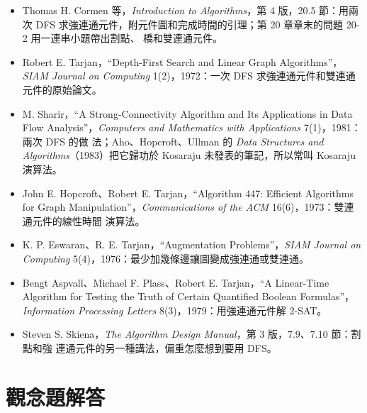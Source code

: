 \begin{itemize}
\item Thomas H. Cormen 等，\textit{Introduction to Algorithms}，第 4 版，20.5 節：用兩次
DFS 求強連通元件，附元件圖和完成時間的引理；第 20 章章末的問題 20-2 用一連串小題帶出割點、
橋和雙連通元件。
\item Robert E. Tarjan，``Depth-First Search and Linear Graph Algorithms''，\textit{SIAM
Journal on Computing} 1(2)，1972：一次 DFS 求強連通元件和雙連通元件的原始論文。
\item M. Sharir，``A Strong-Connectivity Algorithm and Its Applications in Data Flow
Analysis''，\textit{Computers and Mathematics with Applications} 7(1)，1981：兩次 DFS 的做
法；Aho、Hopcroft、Ullman 的 \textit{Data Structures and Algorithms}（1983）把它歸功於
Kosaraju 未發表的筆記，所以常叫 Kosaraju 演算法。
\item John E. Hopcroft、Robert E. Tarjan，``Algorithm 447: Efficient Algorithms for Graph
Manipulation''，\textit{Communications of the ACM} 16(6)，1973：雙連通元件的線性時間
演算法。
\item K. P. Eswaran、R. E. Tarjan，``Augmentation Problems''，\textit{SIAM Journal on
Computing} 5(4)，1976：最少加幾條邊讓圖變成強連通或雙連通。
\item Bengt Aspvall、Michael F. Plass、Robert E. Tarjan，``A Linear-Time Algorithm for
Testing the Truth of Certain Quantified Boolean Formulas''，\textit{Information
Processing Letters} 8(3)，1979：用強連通元件解 2-SAT。
\item Steven S. Skiena，\textit{The Algorithm Design Manual}，第 3 版，7.9、7.10 節：割點和強
連通元件的另一種講法，偏重怎麼想到要用 DFS。
\end{itemize}

\section*{觀念題解答}

